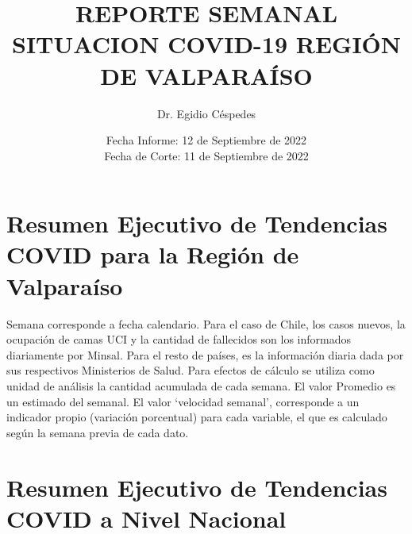 \documentclass{article}
\title{\textbf{REPORTE SEMANAL SITUACION COVID-19 REGIÓN DE VALPARAÍSO}}
\author{Dr. Egidio Céspedes}
\date{Fecha Informe: 12 de Septiembre de 2022\\
Fecha de Corte: 11 de Septiembre de 2022}
\begin{document}
\maketitle

\section{Resumen Ejecutivo de Tendencias COVID para la Región de Valparaíso}

Semana corresponde a fecha calendario. Para el caso de Chile, los casos nuevos, la ocupación de camas UCI y la cantidad de fallecidos son los informados diariamente por Minsal. Para el resto de países, es la información diaria dada por sus respectivos Ministerios de Salud. Para efectos de cálculo se utiliza como unidad de análisis la cantidad acumulada de cada semana. El valor Promedio es un estimado del semanal. El valor ‘velocidad semanal’, corresponde a un indicador propio (variación porcentual) para cada variable, el que es calculado según la semana previa de cada dato.

\begin{table}[H]
  \centering
  \caption{Datos calculados para Región de Valparaíso}
  \label{tab:Tabla1}
\end{table}

\section{Resumen Ejecutivo de Tendencias COVID a Nivel Nacional}

\begin{table}[H]
  \centering
  \caption{Datos calculados para Chile}
  \label{tab:Tabla2}
\end{table}
\end{document}
